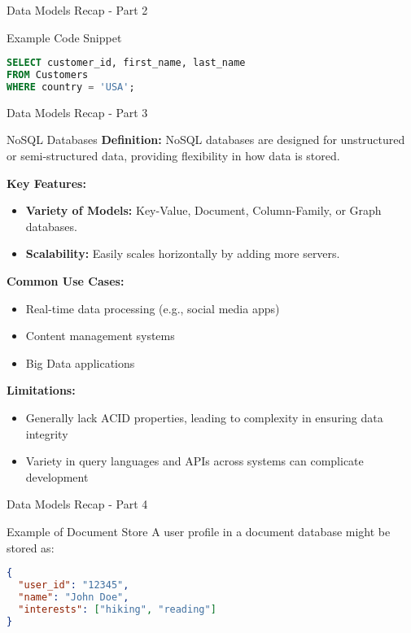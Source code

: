 \documentclass[aspectratio=169]{beamer}
\begin{document}
\begin{frame}[fragile]{Data Models Recap - Part 2}
  \begin{block}{Example Code Snippet}
    \begin{lstlisting}[language=SQL]
SELECT customer_id, first_name, last_name
FROM Customers
WHERE country = 'USA';
    \end{lstlisting}
  \end{block}
\end{frame}

\begin{frame}[fragile]{Data Models Recap - Part 3}
  \begin{block}{NoSQL Databases}
    \textbf{Definition:}  
    NoSQL databases are designed for unstructured or semi-structured data, providing flexibility in how data is stored.

    \textbf{Key Features:}
    \begin{itemize}
      \item \textbf{Variety of Models:} Key-Value, Document, Column-Family, or Graph databases.
      \item \textbf{Scalability:} Easily scales horizontally by adding more servers.
    \end{itemize}

    \textbf{Common Use Cases:}
    \begin{itemize}
      \item Real-time data processing (e.g., social media apps)
      \item Content management systems
      \item Big Data applications
    \end{itemize}

    \textbf{Limitations:}
    \begin{itemize}
      \item Generally lack ACID properties, leading to complexity in ensuring data integrity
      \item Variety in query languages and APIs across systems can complicate development
    \end{itemize}
  \end{block}
\end{frame}

\begin{frame}[fragile]{Data Models Recap - Part 4}
  \begin{block}{Example of Document Store}
    A user profile in a document database might be stored as:
    \begin{lstlisting}[language=json]
{
  "user_id": "12345",
  "name": "John Doe",
  "interests": ["hiking", "reading"]
}
    \end{lstlisting}
  \end{block}
\end{frame}
\end{document}
